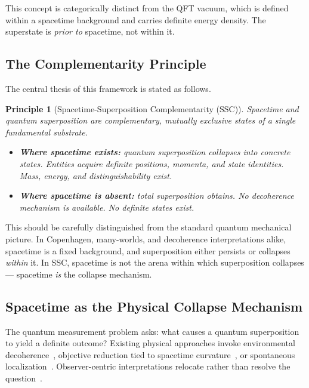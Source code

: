 \documentclass[12pt,a4paper]{article}
\newtheorem{principle}{Principle}
\begin{document}
\noindent
This concept is categorically distinct from the QFT vacuum, which is
defined within a spacetime background and carries definite energy
density.  The superstate is \emph{prior to} spacetime, not within it.

\subsection{The Complementarity Principle}
\label{sec:complementarity}

The central thesis of this framework is stated as follows.

\begin{principle}[Spacetime-Superposition Complementarity (SSC)]
\label{pr:ssc}
Spacetime and quantum superposition are complementary, mutually
exclusive states of a single fundamental substrate.
\begin{itemize}
  \item \textbf{Where spacetime exists:} quantum superposition
        collapses into concrete states.  Entities acquire definite
        positions, momenta, and state identities.  Mass, energy, and
        distinguishability exist.
  \item \textbf{Where spacetime is absent:} total superposition
        obtains.  No decoherence mechanism is available.  No definite
        states exist.
\end{itemize}
\end{principle}

\noindent
This should be carefully distinguished from the standard quantum
mechanical picture.  In Copenhagen, many-worlds, and decoherence
interpretations alike, spacetime is a fixed background, and superposition
either persists or collapses \emph{within} it.  In SSC, spacetime is
not the arena within which superposition collapses — spacetime
\emph{is} the collapse mechanism.

\subsection{Spacetime as the Physical Collapse Mechanism}

The quantum measurement problem asks: what causes a quantum
superposition to yield a definite outcome?  Existing physical
approaches invoke environmental decoherence~\citep{zurek2003},
objective reduction tied to spacetime
curvature~\citep{penrose1996}, or spontaneous
localization~\citep{ghirardi1986}.  Observer-centric interpretations
relocate rather than resolve the question~\citep{bohr1935}.
\end{document}

